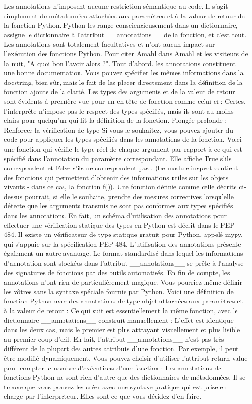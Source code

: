 Les annotations n'imposent aucune restriction sémantique au code.  Il s'agit simplement de métadonnées attachées aux paramètres et à la valeur de retour de la fonction Python.  Python les range consciencieusement dans un dictionnaire, assigne le dictionnaire à l'attribut __annotations__ de la fonction, et c'est tout.  Les annotations sont totalement facultatives et n'ont aucun impact sur l'exécution des fonctions Python.
Pour citer Amahl dans Amahl et les visiteurs de la nuit, "A quoi bon l'avoir alors ?".
Tout d'abord, les annotations constituent une bonne documentation.  Vous pouvez spécifier les mêmes informations dans la docstring, bien sûr, mais le fait de les placer directement dans la définition de la fonction ajoute de la clarté.  Les types des arguments et de la valeur de retour sont évidents à première vue pour un en-tête de fonction comme celui-ci :
Certes, l'interprète n'impose pas le respect des types spécifiés, mais ils sont au moins clairs pour quelqu'un qui lit la définition de la fonction.
Plongée profonde : Renforcer la vérification de type
Si vous le souhaitez, vous pouvez ajouter du code pour appliquer les types spécifiés dans les annotations de la fonction. Voici une fonction qui vérifie le type réel de chaque argument par rapport à ce qui est spécifié dans l'annotation du paramètre correspondant. Elle affiche True s'ils correspondent et False s'ils ne correspondent pas :
(Le module inspect contient des fonctions qui permettent d'obtenir des informations utiles sur les objets vivants - dans ce cas, la fonction f()).
Une fonction définie comme celle décrite ci-dessus pourrait, si elle le souhaite, prendre des mesures correctives lorsqu'elle détecte que les arguments transmis ne sont pas conformes aux types spécifiés dans les annotations.
En fait, un schéma d'utilisation des annotations pour effectuer une vérification statique des types en Python est décrit dans le PEP 484.  Il existe un vérificateur de type statique gratuit pour Python, appelé mypy, qui s'appuie sur la spécification PEP 484.
L'utilisation des annotations présente également un autre avantage.  Le format standardisé dans lequel les informations d'annotation sont stockées dans l'attribut __annotations__ se prête à l'analyse des signatures de fonctions par des outils automatisés.
En fin de compte, les annotations n'ont rien de particulièrement magique.  Vous pourriez même définir les vôtres sans la syntaxe spéciale fournie par Python.  Voici une définition de fonction Python avec des annotations de type objet attachées aux paramètres et à la valeur de retour :
Ce qui suit est essentiellement la même fonction, avec le dictionnaire __annotations__ construit manuellement :
L'effet est identique dans les deux cas, mais le premier est plus attrayant visuellement et plus lisible au premier coup d'œil.
En fait, l'attribut __annotations__ n'est pas très différent de la plupart des autres attributs d'une fonction.  Par exemple, il peut être modifié dynamiquement.  Vous pouvez choisir d'utiliser l'attribut return value pour compter le nombre d'exécutions d'une fonction :
Les annotations de fonctions Python ne sont rien d'autre que des dictionnaires de métadonnées.  Il se trouve que vous pouvez les créer avec une syntaxe pratique qui est prise en charge par l'interpréteur.  Elles sont ce que vous décidez d'en faire.
